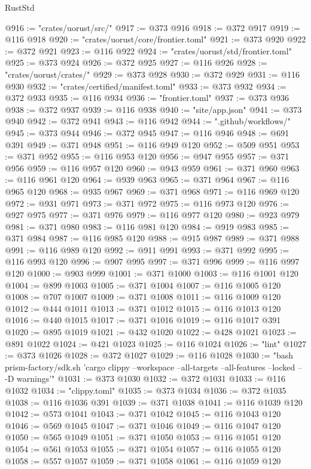 \begin{lexlean}{RustStd}
\begin{coremodule}
@916 := "crates/uorust/src/"
@917 := @373 @916
@918 := @372 @917
@919 := @116 @918
@920 := "crates/uorust/core/frontier.toml"
@921 := @373 @920
@922 := @372 @921
@923 := @116 @922
@924 := "crates/uorust/std/frontier.toml"
@925 := @373 @924
@926 := @372 @925
@927 := @116 @926
@928 := "crates/uorust/crates/"
@929 := @373 @928
@930 := @372 @929
@931 := @116 @930
@932 := "crates/certified/manifest.toml"
@933 := @373 @932
@934 := @372 @933
@935 := @116 @934
@936 := "frontier.toml"
@937 := @373 @936
@938 := @372 @937
@939 := @116 @938
@940 := "site/app.json"
@941 := @373 @940
@942 := @372 @941
@943 := @116 @942
@944 := ".github/workflows/"
@945 := @373 @944
@946 := @372 @945
@947 := @116 @946
@948 := @691 @391
@949 := @371 @948
@951 := @116 @949 @120
@952 := @509 @951
@953 := @371 @952
@955 := @116 @953 @120
@956 := @947 @955
@957 := @371 @956
@959 := @116 @957 @120
@960 := @943 @959
@961 := @371 @960
@963 := @116 @961 @120
@964 := @939 @963
@965 := @371 @964
@967 := @116 @965 @120
@968 := @935 @967
@969 := @371 @968
@971 := @116 @969 @120
@972 := @931 @971
@973 := @371 @972
@975 := @116 @973 @120
@976 := @927 @975
@977 := @371 @976
@979 := @116 @977 @120
@980 := @923 @979
@981 := @371 @980
@983 := @116 @981 @120
@984 := @919 @983
@985 := @371 @984
@987 := @116 @985 @120
@988 := @915 @987
@989 := @371 @988
@991 := @116 @989 @120
@992 := @911 @991
@993 := @371 @992
@995 := @116 @993 @120
@996 := @907 @995
@997 := @371 @996
@999 := @116 @997 @120
@1000 := @903 @999
@1001 := @371 @1000
@1003 := @116 @1001 @120
@1004 := @899 @1003
@1005 := @371 @1004
@1007 := @116 @1005 @120
@1008 := @707 @1007
@1009 := @371 @1008
@1011 := @116 @1009 @120
@1012 := @444 @1011
@1013 := @371 @1012
@1015 := @116 @1013 @120
@1016 := @440 @1015
@1017 := @371 @1016
@1019 := @116 @1017 @391
@1020 := @895 @1019
@1021 := @432 @1020
@1022 := @428 @1021
@1023 := @891 @1022
@1024 := @421 @1023
@1025 := @116 @1024
@1026 := "lint"
@1027 := @373 @1026
@1028 := @372 @1027
@1029 := @116 @1028
@1030 := "bash prism-factory/sdk.sh 'cargo clippy --workspace --all-targets --all-features --locked -- -D warnings'"
@1031 := @373 @1030
@1032 := @372 @1031
@1033 := @116 @1032
@1034 := "clippy.toml"
@1035 := @373 @1034
@1036 := @372 @1035
@1038 := @116 @1036 @391
@1039 := @371 @1038
@1041 := @116 @1039 @120
@1042 := @573 @1041
@1043 := @371 @1042
@1045 := @116 @1043 @120
@1046 := @569 @1045
@1047 := @371 @1046
@1049 := @116 @1047 @120
@1050 := @565 @1049
@1051 := @371 @1050
@1053 := @116 @1051 @120
@1054 := @561 @1053
@1055 := @371 @1054
@1057 := @116 @1055 @120
@1058 := @557 @1057
@1059 := @371 @1058
@1061 := @116 @1059 @120

\end{coremodule}
\end{lexlean}
